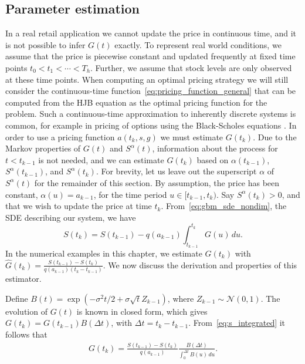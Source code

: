 \documentclass[main.tex]{subfiles}
\begin{document}
\subsection{Parameter estimation}\label{subsec:param_estim}
In a real retail application we cannot update the price in continuous
time, and it is not possible to infer $G(t)$ exactly.
To represent real world conditions, we assume that
the price is piecewise constant and updated frequently at fixed time points
$t_0<t_1<\cdots<T_h$.
Further, we assume that stock levels are only observed at these time
points. When computing an optimal pricing strategy
we will still consider the continuous-time
function~\eqref{eq:pricing_function_general} that can be computed from
the HJB equation as
the optimal pricing function for the problem. Such a continuous-time
approximation to inherently discrete systems is common, for example
in pricing of options using the Black-Scholes equations
\citep{black1973pricing}.
In order to use a pricing function $a(t_k,s,g)$ we must estimate
$G(t_k)$.
Due to the Markov properties of $G(t)$ and $S^{\alpha}(t)$, information
about the process for $t<t_{k-1}$ is not needed, and we can estimate
$G(t_k)$ based on $\alpha(t_{k-1})$, $S^\alpha(t_{k-1})$, and $S^\alpha(t_k)$.
For brevity, let us leave out the superscript $\alpha$ of
$S^\alpha(t)$ for the remainder of this section.
By assumption, the price has been constant, $\alpha(u)=a_{k-1}$, for the time
period $u\in[t_{k-1},t_{k})$. Say $S^\alpha(t_{k})>0$, and that we wish to update the price at time
$t_{k}$.
From~\eqref{eq:gbm_sde_nondim}, the SDE describing our system, we have
\begin{equation}\label{eq:s_integrated}
  S(t_{k})=S(t_{k-1})-q(a_{k-1})\int_{t_{k-1}}^{t_{k}}G(u)\,du.
\end{equation}
In the numerical examples in this chapter, we estimate $G(t_{k})$ with
$\hat G(t_{k})=\frac{S(t_{k-1})-S(t_{k})}{q(a_{k-1})(t_{k}-t_{k-1})}$.
We now discuss the derivation and properties of this estimator.

Define $B(t) =  \exp(-\sigma^2 t/2+\sigma\sqrt{t}Z_{k-1})$, where $Z_{k-1}\sim
\mathcal{N}(0,1)$. The evolution of $G(t)$ is known in closed form,
which gives
$G(t_{k})=G(t_{k-1})B(\Delta t)$, with $\Delta t = t_{k}-t_{k-1}$.
From~\eqref{eq:s_integrated} it follows that
\begin{align}
  G(t_{k}) = \frac{S(t_{k-1})-S(t_{k})}{q(a_{k-1})}\frac{B(\Delta
  t)}{\int_{0}^{\Delta t}B(u)\,du}.
\end{align}
\end{document}
